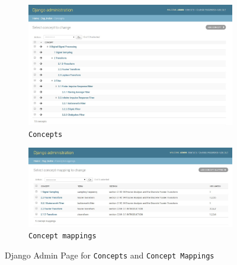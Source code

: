 \begin{figure}[!htbp]
\centering
 
  \begin{subfigure}{\textwidth}
  \centering
  \includegraphics[width=\linewidth]{system_demonstration/demo_admin_concepts.jpg}
  \caption{\texttt{Concepts}}
  \label{fig:sfig:admin_concepts}
  \end{subfigure}
  
  \begin{subfigure}{\textwidth}
  \centering
  \includegraphics[width=\linewidth]{system_demonstration/demo_admin_concept_mappings.jpg}
  \caption{\texttt{Concept mappings}}
  \label{fig:sfig:admin_mappings}
  \end{subfigure}
 
\caption{Django Admin Page for \texttt{Concepts} and \texttt{Concept Mappings}}
\label{fig:django_admin_concept_mapping}
\end{figure}